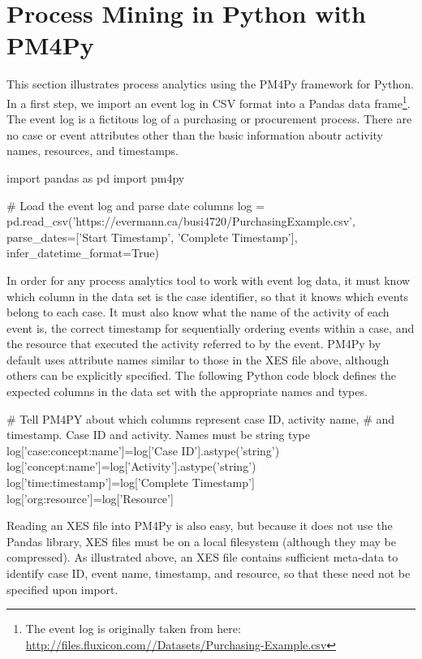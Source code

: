 \section{Process Mining in Python with PM4Py}

This section illustrates process analytics using the PM4Py framework for Python. In a first step, we import an event log in CSV format into a Pandas data frame\footnote{The event log is originally taken from here: \url{http://files.fluxicon.com//Datasets/Purchasing-Example.csv}}. The event log is a fictitous log of a purchasing or procurement process. There are no case or event attributes other than the basic information aboutr activity names, resources, and timestamps.

\begin{samepage}
\begin{pythoncode}
import pandas as pd
import pm4py

# Load the event log and parse date columns
log = pd.read_csv('https://evermann.ca/busi4720/PurchasingExample.csv', 
   parse_dates=['Start Timestamp', 'Complete Timestamp'], 
   infer_datetime_format=True)
\end{pythoncode}
\end{samepage}

In order for any process analytics tool to work with event log data, it must know which column in the data set is the case identifier, so that it knows which events belong to each case. It must also know what the name of the activity of each event is, the correct timestamp for sequentially ordering events within a case, and the resource that executed the activity referred to by the event. PM4Py by default uses attribute names similar to those in the XES file above, although others can be explicitly specified. The following Python code block defines the expected columns in the data set with the appropriate names and types.

\begin{samepage}
\begin{pythoncode}
# Tell PM4PY about which columns represent case ID, activity name, 
# and timestamp. Case ID and activity. Names must be string type
log['case:concept:name']=log['Case ID'].astype('string')
log['concept:name']=log['Activity'].astype('string')
log['time:timestamp']=log['Complete Timestamp']
log['org:resource']=log['Resource']
\end{pythoncode}
\end{samepage}

Reading an XES file into PM4Py is also easy, but because it does not use the Pandas library, XES files must be on a local filesystem (although they may be compressed). As illustrated above, an XES file contains sufficient meta-data to identify case ID, event name, timestamp, and resource, so that these need not be specified upon import.

